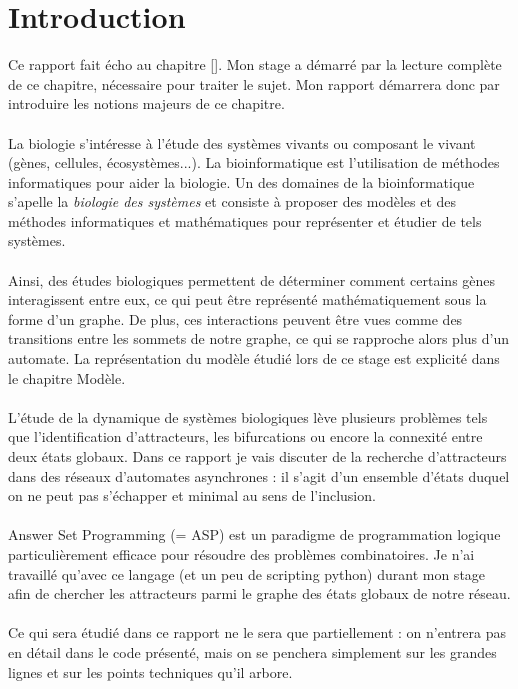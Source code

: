 \documentclass[12pt,a4paper]{article}
\begin{document}
\section{Introduction}
Ce rapport fait écho au chapitre [\cite{chapitre}]. Mon stage a démarré par la lecture complète de ce chapitre, nécessaire pour traiter le sujet.
Mon rapport démarrera donc par introduire les notions majeurs de ce chapitre.\\ \\
La biologie s'intéresse à l'étude des systèmes vivants ou composant le vivant (gènes, cellules, écosystèmes...). La bioinformatique est l'utilisation de méthodes informatiques pour aider la biologie. Un des domaines de la 
bioinformatique s'apelle la \emph{biologie des systèmes} et consiste à proposer des modèles et des méthodes informatiques et mathématiques pour représenter et étudier de tels systèmes.\\ \\
Ainsi, des études biologiques permettent de déterminer comment certains gènes interagissent entre eux, ce qui peut être représenté mathématiquement sous la forme d'un graphe. De plus, ces interactions peuvent être vues comme des 
transitions entre les sommets de notre graphe, ce qui se rapproche alors plus d'un automate. La représentation du modèle étudié lors de ce stage est explicité dans le chapitre Modèle.\\ \\
L'étude de la dynamique de systèmes biologiques lève plusieurs problèmes tels que l'identification d'attracteurs, les bifurcations ou encore la connexité entre deux états globaux. Dans ce rapport je vais discuter de la recherche 
d'attracteurs dans des réseaux d'automates asynchrones : il s'agit d'un ensemble d'états duquel on ne peut pas s'échapper et minimal au sens de l'inclusion.\\ \\
Answer Set Programming (= ASP) est un paradigme de programmation logique particulièrement efficace pour résoudre des problèmes combinatoires. Je n'ai travaillé qu'avec ce langage (et un peu de scripting python) 
durant mon stage afin de chercher les attracteurs parmi le graphe des états globaux de notre réseau.\\ \\
Ce qui sera étudié dans ce rapport ne le sera que partiellement : on n'entrera pas en détail dans le code présenté, mais on se penchera simplement sur les grandes lignes et sur les points techniques qu'il arbore.
\end{document}
